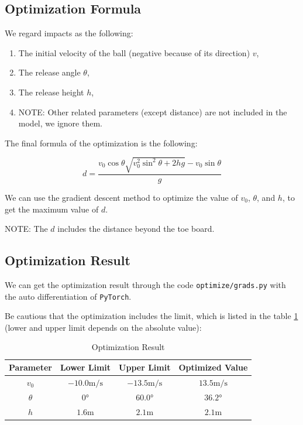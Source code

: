 \documentclass{article}
\begin{document}
\subsection{Optimization Formula}

We regard impacts as the following:

\begin{enumerate}
    \item The initial velocity of the ball (negative because of its direction) $v$,
    \item The release angle $\theta$,
    \item The release height $h$,
    \item NOTE: Other related parameters (except distance) are not included in the model, we ignore them.
\end{enumerate}

The final formula of the optimization is the following:

\begin{equation}
    d = \dfrac{v_0\cos\theta\sqrt{v_0^2\sin^2\theta+2hg}-v_0\sin\theta}{g}
\end{equation}

We can use the gradient descent method to optimize the value of $v_0$, $\theta$, and $h$, to get the maximum value of $d$.

NOTE: The $d$ includes the distance beyond the toe board.

\subsection{Optimization Result}
\label{subsection:optimization-result}

We can get the optimization result through the code \texttt{optimize/grads.py} with the auto differentiation of \texttt{PyTorch}.

Be cautious that the optimization includes the limit, which is listed in the table \ref{table:optimization-result} (lower and upper limit depends on the absolute value):

\begin{table}[H]
    \centering
    \begin{tabular}{cccc}
        \hline
        \textbf{Parameter} & \textbf{Lower Limit} & \textbf{Upper Limit} & \textbf{Optimized Value} \\
        \hline
        $v_0$ & $-10.0\si{\meter/\second}$ & $-13.5\si{\meter/\second}$ & $13.5\si{\meter/\second}$ \\
        $\theta$ & $0\si{\degree}$ & $60.0\si{\degree}$ & $36.2\si{\degree}$ \\
        $h$ & $1.6\si{\meter}$ & $2.1\si{\meter}$ & $2.1\si{\meter}$ \\
        \hline
    \end{tabular}
    \caption{Optimization Result}
    \label{table:optimization-result}
\end{table}
\end{document}
